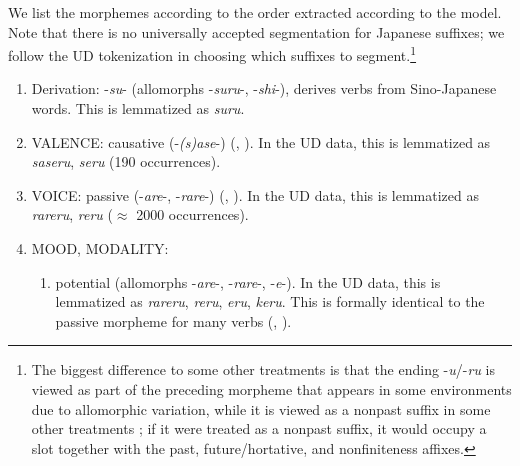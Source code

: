 \documentclass[11pt,letterpaper]{article}
\begin{document}
We list the morphemes according to the order extracted according to the model.
Note that there  is no universally accepted segmentation for Japanese suffixes; we follow the UD tokenization in choosing which suffixes to segment.\footnote{The biggest difference to some other treatments is that the ending -\textit{u}/-\textit{ru} is viewed as part of the preceding morpheme that appears in some environments due to allomorphic variation, while it is viewed as a nonpast suffix in some other treatments \citep[p.116]{hasegawa2014japanese}; if it were treated as a nonpast suffix, it would occupy a slot together with the past, future/hortative, and nonfiniteness affixes.}



\begin{enumerate}
\item Derivation: -\textit{su}- (allomorphs -\textit{suru}-, -\textit{shi}-), derives verbs from Sino-Japanese words. This is lemmatized as \textit{suru}.
	\item VALENCE: causative (-\textit{(s)ase}-) (\citet[142]{hasegawa2014japanese}, \citet[Chapter 13]{kaiser2013japanese}). In the UD data, this is lemmatized as \textit{saseru}, \textit{seru} (190 occurrences).
	\item VOICE: passive (-\textit{are}-, -\textit{rare}-) (\citet[152]{hasegawa2014japanese}, \citet[Chapter 12]{kaiser2013japanese}).  In the UD data, this is lemmatized as \textit{rareru}, \textit{reru} ($\approx$ 2000 occurrences).
\item MOOD, MODALITY:
\begin{enumerate}
\item potential (allomorphs -\textit{are}-, -\textit{rare}-, -\textit{e}-). In the UD data, this is lemmatized as \textit{rareru}, \textit{reru}, \textit{eru}, \textit{keru}.
This is formally identical to the passive morpheme for many verbs (\citet[346]{vaccari1938complete}, \citet[398]{kaiser2013japanese}).




\end{enumerate}
\end{enumerate}
\end{document}
